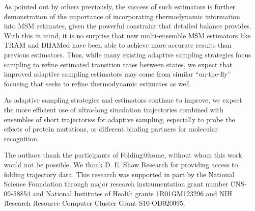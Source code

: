 \documentclass[%
 aip,
rsi,%
 amsmath,amssymb,
 reprint,%
]{revtex4-1}
\begin{document}
As pointed out by others previously,\cite{TrendelkampSchroer:2016bz} the success of such estimators is further demonstration of the importance of incorporating thermodynamic information into MSM estimates, given the powerful constraint that detailed balance provides. With this in mind, it is no surprise that new multi-ensemble MSM estimators like TRAM\cite{Wu:2016fk} and DHAMed\cite{Stelzl:2017gra} have been able to achieve more accurate results than previous estimators. Thus, while many existing adaptive sampling strategies focus sampling to refine estimated transition rates between states, we expect that improved adaptive sampling estimators may come from similar ``on-the-fly'' focusing that seeks to refine thermodynamic estimates as well.  

As adaptive sampling strategies and estimators continue to improve, we expect the more efficient use of ultra-long simulation trajectories combined with ensembles of short trajectories for adaptive sampling, especially to probe the effects of protein mutations, or different binding partners for molecular recognition.


\begin{acknowledgments}
The authors thank the participants of Folding@home, without whom this work would not be possible.  We thank D. E. Shaw Research for providing access to folding trajectory data. This research was supported in part by the National Science Foundation through major research instrumentation grant number CNS-09-58854 and National Institutes of Health grants 1R01GM123296 and NIH Research Resource Computer Cluster Grant S10-OD020095.
\end{acknowledgments}

%




\newpage


\end{document}

